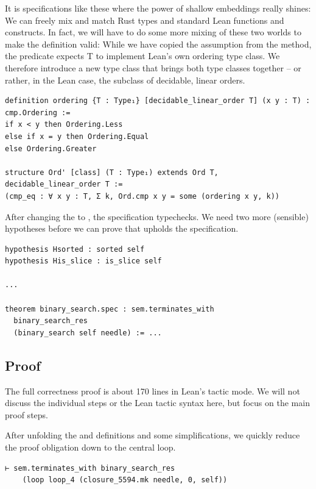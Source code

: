 It is specifications like these where the power of shallow embeddings really
shines: We can freely mix and match Rust types and standard Lean functions and
constructs. In fact, we will have to do some more mixing of these two worlds to make
the definition valid: While we have copied the assumption  from
the  method, the  predicate expects T to
implement Lean's own ordering type class. We therefore introduce a new type class
 that brings both type classes together -- or rather, in the Lean case, the
subclass of decidable, linear orders.

\begin{verbatim}
definition ordering {T : Type₁} [decidable_linear_order T] (x y : T) : cmp.Ordering :=
if x < y then Ordering.Less
else if x = y then Ordering.Equal
else Ordering.Greater

structure Ord' [class] (T : Type₁) extends Ord T, decidable_linear_order T :=
(cmp_eq : ∀ x y : T, Σ k, Ord.cmp x y = some (ordering x y, k))
\end{verbatim}

After changing the  to \lean{[Ord' T]}, the
specification typechecks. We need two more (sensible) hypotheses before we can
prove that  upholds the specification.

\begin{verbatim}
hypothesis Hsorted : sorted self
hypothesis His_slice : is_slice self

...

theorem binary_search.spec : sem.terminates_with
  binary_search_res
  (binary_search self needle) := ...
\end{verbatim}

\subsection{Proof}

The full correctness proof is about 170 lines in Lean's tactic mode. We will not
discuss the individual steps or the Lean tactic syntax here, but focus on the main
proof steps.

After unfolding the  and 
definitions and some simplifications, we quickly reduce the proof obligation
down to the central loop.

\begin{verbatim}
⊢ sem.terminates_with binary_search_res
    (loop loop_4 (closure_5594.mk needle, 0, self))
\end{verbatim}

